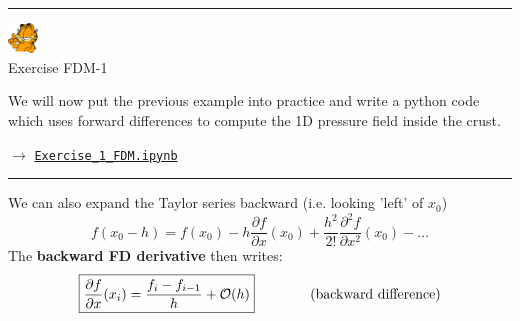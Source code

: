 \begin{center}
\begin{minipage}[t]{0.77\textwidth}
\par\noindent\rule{\textwidth}{0.4pt}

\begin{center}
\includegraphics[width=0.8cm]{images/garftr} \\
{\color{orange}Exercise FDM-1}
\end{center}

We will now put the previous example into practice and write a 
python code which uses forward differences to compute the 1D pressure
field inside the crust.

$\rightarrow$ 
\href{http://cedricthieulot.net/images/compgeo/Exercise_1_FDM.ipynb}
{\tt Exercise\_1\_FDM.ipynb}

\par\noindent\rule{\textwidth}{0.4pt}
\end{minipage}
\end{center}







\noindent We can also expand the Taylor series backward (i.e. looking 'left' of $x_0$)
\begin{equation}
f(x_0-h)=f(x_0)-
h \frac{\partial f}{\partial x}(x_0)  + 
\frac{h^2}{2!} \frac{\partial^2 f}{\partial x^2}(x_0)  -
\dots 
\end{equation}
The {\bf backward FD derivative} then writes:
\begin{equation}
\boxed{
\frac{\partial f}{\partial x}(x_i) = \frac{f_{i}-f_{i-1}}{h} + {\cal O}(h) 
}
\qquad
\qquad
\text{(backward difference)} 
\end{equation}




